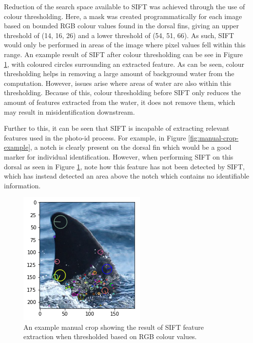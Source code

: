 Reduction of the search space available to SIFT was achieved through the use of colour thresholding. Here, a mask was created programmatically for each image based on bounded RGB colour values found in the dorsal fins, giving an upper threshold of (14, 16, 26) and a lower threshold of (54, 51, 66). As such, SIFT would only be performed in areas of the image where pixel values fell within this range. An example result of SIFT after colour thresholding can be see in Figure \ref{fig:manual-crop-sift-colour-thresholding-example}, with coloured circles surrounding an extracted feature. As can be seen, colour thresholding helps in removing a large amount of background water from the computation. However, issues arise where areas of water are also within this thresholding. Because of this, colour thresholding before SIFT only reduces the amount of features extracted from the water, it does not remove them, which may result in misidentification downstream.

Further to this, it can be seen that SIFT is incapable of extracting relevant features used in the photo-id process. For example, in Figure \ref{fig:manual-crop-example}, a notch is clearly present on the dorsal fin which would be a good marker for individual identification. However, when performing SIFT on this dorsal as seen in Figure \ref{fig:manual-crop-sift-colour-thresholding-example}, note how this feature has not been detected by SIFT, which has instead detected an area above the notch which contains no identifiable information. 

\begin{figure}
	\begin{center}
		\includegraphics[scale=0.6]{Chapter3/figs/manual-crop-sift-colour-thresholding.png}
	\end{center}
	\caption{An example manual crop showing the result of SIFT feature extraction when thresholded based on RGB colour values.
	}
	\label{fig:manual-crop-sift-colour-thresholding-example}
\end{figure}


